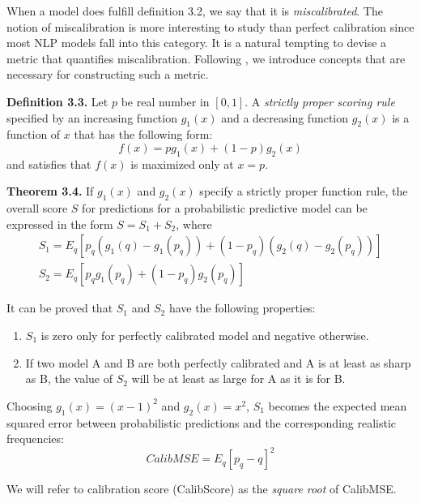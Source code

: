When a model does fulfill definition 3.2, we say that it is \textit{miscalibrated}. The notion of miscalibration is more interesting to study than perfect calibration since most NLP models fall into this category. It is a natural tempting to devise a metric that quantifies miscalibration. Following \cite{degroot1983comparison}, we introduce concepts that are necessary for constructing such a metric.

\textbf{Definition 3.3.} Let $p$ be real number in $[0, 1]$. A \textit{strictly proper scoring rule} specified by an increasing function $g_1(x)$ and a decreasing function $g_2(x)$ is a function of $x$ that has the following form:
\begin{equation}
    \displaystyle f(x) = pg_1(x) + (1 - p)g_2(x)
    \label{eqn:proper_rule}
\end{equation}
and satisfies that $f(x)$ is maximized only at $x = p$.

\textbf{Theorem 3.4.} If $g_1(x)$ and $g_2(x)$ specify a strictly proper function rule, the overall score $S$ for predictions for a probabilistic predictive model can be expressed in the form $S = S_1 + S_2$, where
\begin{equation}    
  \begin{array}{l}
    S_1 = E_{q}\left[p_q\left(g_1(q) - g_1(p_q)\right) + \left(1 - p_q\right)\left(g_2(q) - g_2(p_q)\right)\right] \\ 
    S_2 = E_{q}\left[p_qg_1(p_q) + \left(1 - p_q\right)g_2(p_q)\right]
  \end{array}
  \label{eqn:general_metric}
\end{equation}

It can be proved that $S_1$ and $S_2$ have the following properties: 
\begin{enumerate}
  \item $S_1$ is zero only for perfectly calibrated model and negative otherwise.
  \item If two model A and B are both perfectly calibrated and A is at least as sharp as B, the value of $S_2$ will be at least as large for A as it is for B.
\end{enumerate}

Choosing $g_1(x) = (x - 1)^2$ and $g_2(x) = x^2$, $S_1$ becomes the expected mean squared error between probabilistic predictions and the corresponding realistic frequencies:
$$CalibMSE = E_{q}[p_q - q]^2$$

We will refer to calibration score (CalibScore) as the \textit{square root} of CalibMSE. 

